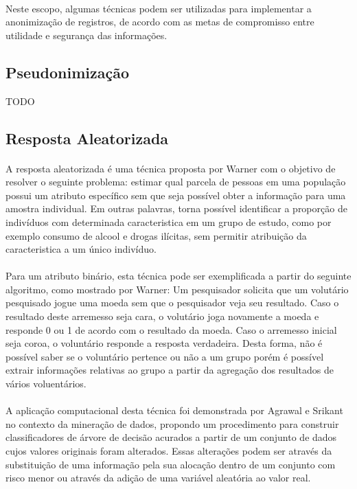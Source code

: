 \paragraph{} Neste escopo, algumas técnicas podem ser utilizadas para implementar a anonimização de registros, de acordo com as metas de compromisso entre utilidade e segurança das informações.

\subsection{Pseudonimização}
TODO

\subsection{Resposta Aleatorizada}

\paragraph{} A resposta aleatorizada é uma técnica proposta por Warner\cite{warner1965randomized} com o objetivo de resolver o seguinte problema: estimar qual parcela de pessoas em uma população possui um atributo específico sem que seja possível obter a informação para uma amostra individual. Em outras palavras, torna possível identificar a proporção de indivíduos com determinada caracteristica em um grupo de estudo, como por exemplo consumo de alcool e drogas ilícitas\cite{davila2010modelo}, sem permitir atribuição da caracteristica a um único indivíduo.

\paragraph{} Para um atributo binário, esta técnica pode ser exemplificada a partir do seguinte algoritmo, como mostrado por Warner: Um pesquisador solicita que um volutário pesquisado jogue uma moeda sem que o pesquisador veja seu resultado. Caso o resultado deste arremesso seja cara, o volutário joga novamente a moeda e responde 0 ou 1 de acordo com o resultado da moeda. Caso o arremesso inicial seja coroa, o voluntário responde a resposta verdadeira.  Desta forma, não é possível saber se o voluntário pertence ou não a um grupo porém é possível extrair informações relativas ao grupo a partir da agregação dos resultados de vários voluentários.

\paragraph{} A aplicação computacional desta técnica foi demonstrada por Agrawal e Srikant\cite{agrawal2000privacy} no contexto da mineração de dados, propondo um procedimento para construir classificadores de árvore de decisão acurados a partir de um conjunto de dados cujos valores originais foram alterados. Essas alterações podem ser através da substituição de uma informação pela sua alocação dentro de um conjunto com risco menor ou através da adição de uma variável aleatória ao valor real.

